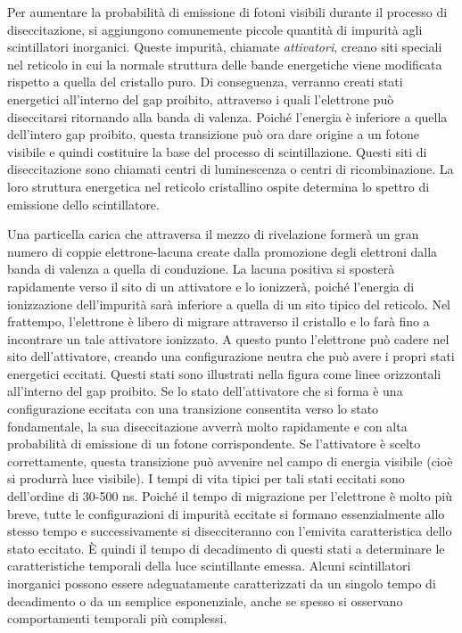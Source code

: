 Per aumentare la probabilità di emissione di fotoni visibili durante il processo di diseccitazione, si aggiungono comunemente piccole quantità di impurità agli scintillatori inorganici. Queste impurità, chiamate \textit{attivatori}, creano siti speciali nel reticolo in cui la normale struttura delle bande energetiche viene modificata rispetto a quella del cristallo puro. Di conseguenza, verranno creati stati energetici all'interno del gap proibito, attraverso i quali l'elettrone può diseccitarsi ritornando alla banda di valenza. Poiché l'energia è inferiore a quella dell'intero gap proibito, questa transizione può ora dare origine a un fotone visibile e quindi costituire la base del processo di scintillazione. Questi siti di diseccitazione sono chiamati centri di luminescenza o centri di ricombinazione. La loro struttura energetica nel reticolo cristallino ospite determina lo spettro di emissione dello scintillatore.

Una particella carica che attraversa il mezzo di rivelazione formerà un gran numero di coppie elettrone-lacuna create dalla promozione degli elettroni dalla banda di valenza a quella di conduzione. La lacuna positiva si sposterà rapidamente verso il sito di un attivatore e lo ionizzerà, poiché l'energia di ionizzazione dell'impurità sarà inferiore a quella di un sito tipico del reticolo. Nel frattempo, l'elettrone è libero di migrare attraverso il cristallo e lo farà fino a incontrare un tale attivatore ionizzato. A questo punto l'elettrone può cadere nel sito dell'attivatore, creando una configurazione neutra che può avere i propri stati energetici eccitati. Questi stati sono illustrati nella figura come linee orizzontali all'interno del gap proibito. Se lo stato dell'attivatore che si forma è una configurazione eccitata con una transizione consentita verso lo stato fondamentale, la sua diseccitazione avverrà molto rapidamente e con alta probabilità di emissione di un fotone corrispondente. Se l'attivatore è scelto correttamente, questa transizione può avvenire nel campo di energia visibile (cioè si produrrà luce visibile). I tempi di vita tipici per tali stati eccitati sono dell'ordine di 30-500 ns. Poiché il tempo di migrazione per l'elettrone è molto più breve, tutte le configurazioni di impurità eccitate si formano essenzialmente allo stesso tempo e successivamente si disecciteranno con l'emivita caratteristica dello stato eccitato. È quindi il tempo di decadimento di questi stati a determinare le caratteristiche temporali della luce scintillante emessa. Alcuni scintillatori inorganici possono essere adeguatamente caratterizzati da un singolo tempo di decadimento o da un semplice esponenziale, anche se spesso si osservano comportamenti temporali più complessi.

